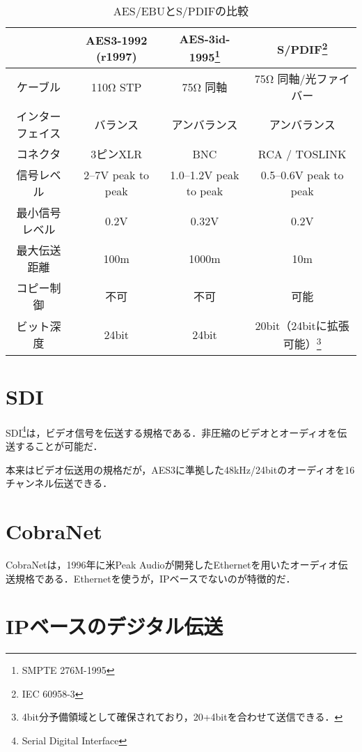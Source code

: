 \begin{table}[htb]
  \begin{minipage}{\textwidth}
    \label{tab:compare}
    \caption{AES/EBUとS/PDIFの比較\cite{aesebuandspdif}}
    \begin{tabular}{c|ccc} \hline
      & AES3-1992 (r1997) & AES-3id-1995\footnote{SMPTE 276M-1995} & S/PDIF\footnote{IEC 60958-3} \\ \hline
      ケーブル & 110Ω STP & 75Ω 同軸 & 75Ω 同軸/光ファイバー \\
      インターフェイス & バランス & アンバランス & アンバランス \\
      コネクタ & 3ピンXLR & BNC & RCA / TOSLINK \\
      信号レベル & 2--7V peak to peak & 1.0--1.2V peak to peak & 0.5--0.6V peak to peak \\
      最小信号レベル & 0.2V & 0.32V & 0.2V \\
      最大伝送距離 & 100m & 1000m & 10m \\
      コピー制御 & 不可 & 不可 & 可能 \\
      ビット深度 & 24bit & 24bit & 20bit（24bitに拡張可能）\footnote{4bit分予備領域として確保されており，20+4bitを合わせて送信できる．} \\
    \end{tabular}
  \end{minipage}
\end{table}

\section{SDI}

SDI\footnote{Serial Digital Interface}は，ビデオ信号を伝送する規格である．非圧縮のビデオとオーディオを伝送することが可能だ．

本来はビデオ伝送用の規格だが，AES3に準拠した48kHz/24bitのオーディオを16チャンネル伝送できる．

\section{CobraNet}

CobraNetは，1996年に米Peak Audioが開発したEthernetを用いたオーディオ伝送規格である．Ethernetを使うが，IPベースでないのが特徴的だ\cite{best-practices-in-network-audio}．

\section*{IPベースのデジタル伝送}

